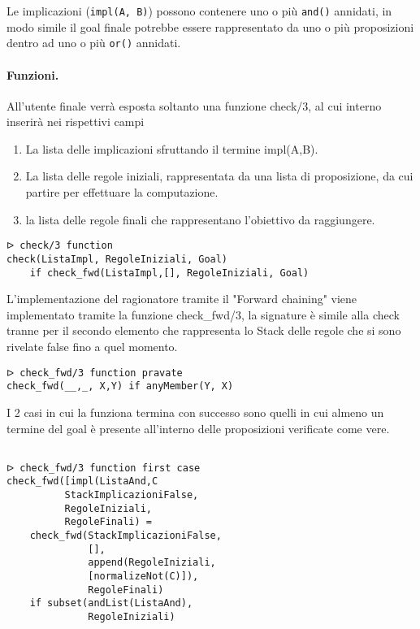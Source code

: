 \documentclass[12pt,twoside]{report}
\begin{document}
Le implicazioni (\texttt{impl(A, B)}) possono contenere uno o più \texttt{and()} annidati, in modo simile il goal finale potrebbe essere rappresentato da uno o più proposizioni dentro ad uno o più \texttt{or()} annidati.

\paragraph{Funzioni.} 

All'utente finale verrà esposta soltanto una funzione check/3, al cui interno inserirà nei rispettivi campi
\begin{enumerate}
    \item La lista delle implicazioni sfruttando il termine impl(A,B).
    \item La lista delle regole iniziali, rappresentata da una lista di proposizione, da cui partire per effettuare la computazione.
    \item la lista delle regole finali che rappresentano l'obiettivo da raggiungere.
\end{enumerate}

\begin{lstlisting}
ᐅ check/3 function
check(ListaImpl, RegoleIniziali, Goal) 
    if check_fwd(ListaImpl,[], RegoleIniziali, Goal)

\end{lstlisting}
L'implementazione del ragionatore tramite il  "Forward chaining" viene implementato tramite la funzione check\_fwd/3, la signature è simile alla check tranne per il secondo elemento che rappresenta lo Stack delle regole che si sono rivelate false fino a quel momento.

\begin{lstlisting}
ᐅ check_fwd/3 function pravate
check_fwd(__,_, X,Y) if anyMember(Y, X)

\end{lstlisting}

I 2 casi in cui la funziona termina con successo sono quelli in cui almeno un termine del goal è presente all'interno delle proposizioni verificate come vere. 

\begin{lstlisting}

ᐅ check_fwd/3 function first case 
check_fwd([impl(ListaAnd,C
          StackImplicazioniFalse, 
          RegoleIniziali, 
          RegoleFinali) =
    check_fwd(StackImplicazioniFalse,
              [], 
              append(RegoleIniziali, 
              [normalizeNot(C)]), 
              RegoleFinali) 
    if subset(andList(ListaAnd), 
              RegoleIniziali)
\end{lstlisting}
\end{document}
